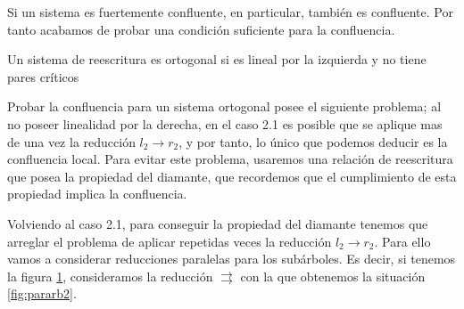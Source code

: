 Si un sistema es fuertemente confluente, en particular, también es
confluente. Por tanto acabamos de probar una condición suficiente para la
confluencia.


\begin{defi}
  Un sistema de reescritura es ortogonal si es lineal por la izquierda
  y no tiene pares críticos
\end{defi}

Probar la confluencia para un sistema ortogonal posee el siguiente
problema; al no poseer linealidad por la derecha, en el caso 2.1 es
posible que se aplique mas de una vez la reducción $l_2 \rightarrow r_2$,
y por tanto, lo único que podemos deducir es la confluencia
local. Para evitar este problema, usaremos una relación de reescritura
que posea la propiedad del diamante, que recordemos que el
cumplimiento de esta propiedad implica la confluencia.

Volviendo al caso 2.1, para conseguir la propiedad del diamante
tenemos que arreglar el problema de aplicar repetidas veces la
reducción $l_2 \rightarrow r_2$. Para ello vamos a considerar
reducciones paralelas para los subárboles. Es decir, si tenemos la
figura \ref{fig:pararb1}, consideramos la reducción
$\rightrightarrows$ con la que obtenemos la situación \ref{fig:pararb2}.

\begin{figure}
\centering
\usetikzlibrary{decorations.pathreplacing}
\caption{}
\label{fig:pararb1}
\end{figure}

